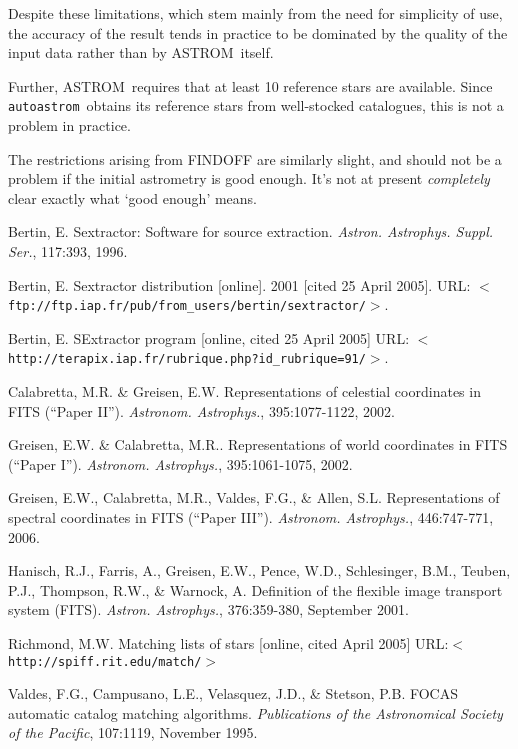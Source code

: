 \documentclass[twoside,11pt]{article}
\newcommand{\ASTROM}{{\footnotesize ASTROM}\normalsize}
\newcommand{\autoastrom}{\texttt{autoastrom}}
\begin{document}
Despite these limitations, which stem mainly from the need for simplicity of
use, the accuracy of the result tends in practice to be dominated by the
quality of the input data rather than by \ASTROM\ itself.

Further, \ASTROM\ requires that at least 10 reference stars are available.
Since \autoastrom\ obtains its reference stars from well-stocked catalogues,
this is not a problem in practice.

The restrictions arising from FINDOFF are similarly slight, and should not be
a problem if the initial astrometry is good enough.  It's not at present
\textit{completely} clear exactly what `good enough' means.

\begin{thebibliography}{}

 Bertin, E. Sextractor: Software for source
  extraction. \textit{Astron. Astrophys. Suppl. Ser.}, 117:393, 1996.

 Bertin, E. Sextractor distribution [online]. 2001
  [cited 25 April 2005]. URL:
  \texttt{$<$ftp://ftp.iap.fr/pub/from\_users/bertin/sextractor/$>$}.

 Bertin, E. SExtractor program [online, cited 25 April
  2005] URL:
  \texttt{$<$http://terapix.iap.fr/rubrique.php?id\_rubrique=91/$>$}.

 Calabretta, M.R. \& Greisen, E.W. Representations of
  celestial coordinates in FITS (``Paper II''). \textit{Astronom. Astrophys.},
  395:1077-1122, 2002.

 Greisen, E.W. \& Calabretta, M.R.. Representations of world
  coordinates in FITS (``Paper I''). \textit{Astronom. Astrophys.},
  395:1061-1075, 2002.

 Greisen, E.W., Calabretta, M.R., Valdes, F.G., \& Allen,
  S.L. Representations of spectral coordinates in FITS (``Paper III'').
  \textit{Astronom. Astrophys.}, 446:747-771, 2006.

 Hanisch, R.J., Farris, A., Greisen, E.W., Pence, W.D.,
  Schlesinger, B.M., Teuben, P.J., Thompson, R.W., \& Warnock, A. Definition
  of the flexible image transport system (FITS). \textit{Astron. Astrophys.},
  376:359-380, September 2001.

 Richmond, M.W. Matching lists of stars [online, cited
  April 2005] URL:\texttt{$<$http://spiff.rit.edu/match/$>$}

 Valdes, F.G., Campusano, L.E., Velasquez, J.D., \& Stetson,
  P.B. FOCAS automatic catalog matching algorithms. \textit{Publications of
    the Astronomical Society of the Pacific}, 107:1119, November 1995.

\end{thebibliography}
\end{document}
